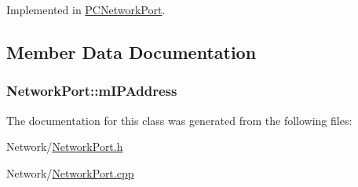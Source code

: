 Implemented in \hyperlink{classPCNetworkPort_aa696d4f119110e976ac791931b1a187a}{P\+C\+Network\+Port}.



\subsection{Member Data Documentation}
\subsubsection[{\texorpdfstring{m\+I\+P\+Address}{mIPAddress}}]{ Network\+Port\+::m\+I\+P\+Address\hspace{0.3cm}{\ttfamily [private]}}\hypertarget{classNetworkPort_a57022ce09dc3684d725caeb42cbe8914}{}\label{classNetworkPort_a57022ce09dc3684d725caeb42cbe8914}


The documentation for this class was generated from the following files\+:\begin{DoxyCompactItemize}
\item 
Network/\hyperlink{NetworkPort_8h}{Network\+Port.\+h}\item 
Network/\hyperlink{NetworkPort_8cpp}{Network\+Port.\+cpp}\end{DoxyCompactItemize}
